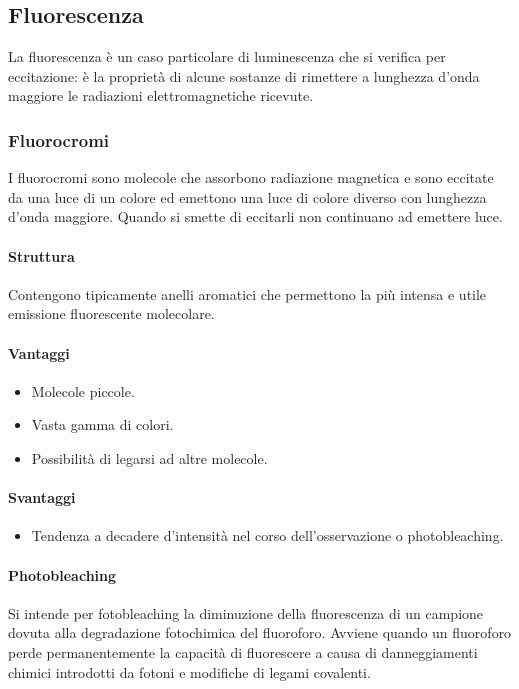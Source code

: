 	\subsection{Fluorescenza}
	La fluorescenza \`e un caso particolare di luminescenza che si verifica per eccitazione: \`e la propriet\`a di alcune sostanze di rimettere a lunghezza d'onda maggiore le radiazioni elettromagnetiche ricevute.

		\subsubsection{Fluorocromi}
		I fluorocromi sono molecole che assorbono radiazione magnetica e sono eccitate da una luce di un colore ed emettono una luce di colore diverso con lunghezza d'onda maggiore.
		Quando si smette di eccitarli non continuano ad emettere luce.

			\paragraph{Struttura}
			Contengono tipicamente anelli aromatici che permettono la pi\`u intensa e utile emissione fluorescente molecolare.

			\begin{multicols}{2}
				\paragraph{Vantaggi}
				\begin{itemize}
					\item Molecole piccole.
					\item Vasta gamma di colori.
					\item Possibilit\`a di legarsi ad altre molecole.
				\end{itemize}
				
				\paragraph{Svantaggi}
				\begin{itemize}
					\item Tendenza a decadere d'intensit\`a nel corso dell'osservazione o photobleaching.
				\end{itemize}
			\end{multicols}

			\paragraph{Photobleaching}
			Si intende per fotobleaching la diminuzione della fluorescenza di un campione dovuta alla degradazione fotochimica del fluoroforo.
			Avviene quando un fluoroforo perde permanentemente la capacit\`a di fluorescere a causa di danneggiamenti chimici introdotti da fotoni e modifiche di legami covalenti.


